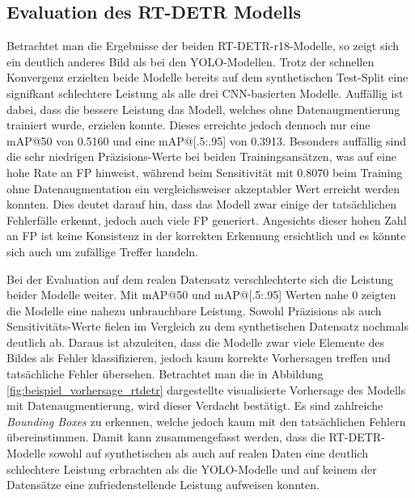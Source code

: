 \subsection[Evaluation des RT-DETR Modells]{Evaluation des \ac{RT-DETR} Modells}

Betrachtet man die Ergebnisse der beiden \ac{RT-DETR}-r18-Modelle, so zeigt sich ein deutlich anderes Bild als bei den \ac{YOLO}-Modellen. Trotz der schnellen Konvergenz erzielten beide Modelle bereits auf dem synthetischen Test-Split eine signifkant schlechtere Leistung als alle drei \ac{CNN}-basierten Modelle. Auffällig ist dabei, dass die bessere Leistung das Modell, welches ohne Datenaugmentierung trainiert wurde, erzielen konnte. Dieses erreichte jedoch dennoch nur eine \ac{mAP}@50 von 0.5160 und eine \ac{mAP}@[.5:.95] von 0.3913. Besonders auffällig sind die sehr niedrigen Präzisions-Werte bei beiden Trainingsansätzen, was auf eine hohe Rate an \ac{FP} hinweist, während beim Sensitivität mit 0.8070 beim Training ohne Datenaugmentation ein vergleichsweiser akzeptabler Wert erreicht werden konnten. Dies deutet darauf hin, dass das Modell zwar einige der tatsächlichen Fehlerfälle erkennt, jedoch auch viele \ac{FP} generiert. Angesichts dieser hohen Zahl an \ac{FP} ist keine Konsistenz in der korrekten Erkennung ersichtlich und es könnte sich auch um zufällige Treffer handeln.

Bei der Evaluation auf dem realen Datensatz verschlechterte sich die Leistung beider Modelle weiter. Mit \ac{mAP}@50 und \ac{mAP}@[.5:.95] Werten nahe 0 zeigten die Modelle eine nahezu unbrauchbare Leistung. Sowohl Präzisions als auch Sensitivitäts-Werte fielen im Vergleich zu dem synthetischen Datensatz nochmals deutlich ab. Daraus ist abzuleiten, dass die Modelle zwar viele Elemente des Bildes als Fehler klassifizieren, jedoch kaum korrekte Vorhersagen treffen und tatsächliche Fehler übersehen. Betrachtet man die in Abbildung \ref{fig:beispiel_vorhersage_rtdetr} dargestellte visualisierte Vorhersage des Modells mit Datenaugmentierung, wird dieser Verdacht bestätigt. Es sind zahlreiche \textit{Bounding Boxes} zu erkennen, welche jedoch kaum mit den tatsächlichen Fehlern übereinstimmen. Damit kann zusammengefasst werden, dass die \ac{RT-DETR}-Modelle sowohl auf synthetischen als auch auf realen Daten eine deutlich schlechtere Leistung erbrachten als die \ac{YOLO}-Modelle und auf keinem der Datensätze eine zufriedenstellende Leistung aufweisen konnten.

